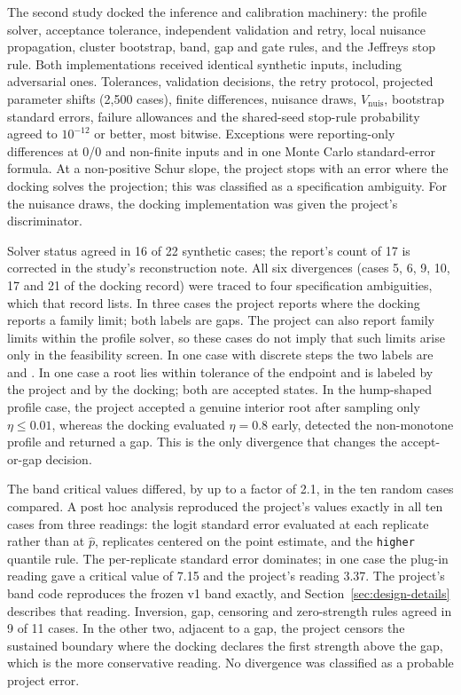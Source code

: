 The second study docked the inference and calibration machinery: the profile solver, acceptance tolerance, independent validation and retry, local nuisance propagation, cluster bootstrap, band, gap and gate rules, and the Jeffreys stop rule. Both implementations received identical synthetic inputs, including adversarial ones. Tolerances, validation decisions, the retry protocol, projected parameter shifts (2,500 cases), finite differences, nuisance draws, $V_{\mathrm{nuis}}$, bootstrap standard errors, failure allowances and the shared-seed stop-rule probability agreed to $10^{-12}$ or better, most bitwise. Exceptions were reporting-only differences at 0/0 and non-finite inputs and in one Monte Carlo standard-error formula. At a non-positive Schur slope, the project stops with an error where the docking solves the projection; this was classified as a specification ambiguity. For the nuisance draws, the docking implementation was given the project's discriminator.

Solver status agreed in 16 of 22 synthetic cases; the report's count of 17 is corrected in the study's reconstruction note. All six divergences (cases 5, 6, 9, 10, 17 and 21 of the docking record) were traced to four specification ambiguities, which that record lists. In three cases the project reports  where the docking reports a family limit; both labels are gaps. The project can also report family limits within the profile solver, so these cases do not imply that such limits arise only in the feasibility screen. In one case with discrete steps the two labels are  and . In one case a root lies within tolerance of the endpoint and is labeled  by the project and  by the docking; both are accepted states. In the hump-shaped profile case, the project accepted a genuine interior root after sampling only $\eta\leq0.01$, whereas the docking evaluated $\eta=0.8$ early, detected the non-monotone profile and returned a gap. This is the only divergence that changes the accept-or-gap decision.

The band critical values differed, by up to a factor of 2.1, in the ten random cases compared. A post hoc analysis reproduced the project's values exactly in all ten cases from three readings: the logit standard error evaluated at each replicate rather than at $\hat p$, replicates centered on the point estimate, and the \texttt{higher} quantile rule. The per-replicate standard error dominates; in one case the plug-in reading gave a critical value of 7.15 and the project's reading 3.37. The project's band code reproduces the frozen v1 band exactly, and Section~\ref{sec:design-details} describes that reading. Inversion, gap, censoring and zero-strength rules agreed in 9 of 11 cases. In the other two, adjacent to a gap, the project censors the sustained boundary where the docking declares the first strength above the gap, which is the more conservative reading. No divergence was classified as a probable project error.

